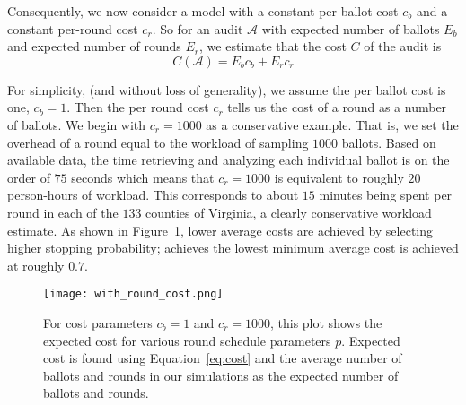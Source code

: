 Consequently, we now consider a model with a constant per-ballot cost $c_b$ and a constant per-round cost $c_r$.
So for an audit $\mathcal{A}$ with expected number of ballots $E_{b}$ and expected number of rounds $E_{r}$, we estimate that the cost $C$ of the audit is
\begin{equation}
C(\mathcal{A}) = E_b c_b + E_r c_r
\label{eq:round_cost}
\end{equation}

For simplicity, (and without loss of generality), we assume the per ballot cost is one, $c_b=1$. Then the per round cost $c_r$ tells us the cost of a round as a number of ballots. We begin with $c_r=1000$ as a conservative example. 
That is, we set the overhead of a round equal to the workload of sampling $1000$ ballots. Based on available data\cite{RI-report}, the time retrieving and analyzing each individual ballot is on the order of $75$ seconds which means that $c_r=1000$ is equivalent to roughly $20$ person-hours of workload. This corresponds to about $15$ minutes being spent per round in each of the $133$ counties of Virginia, a clearly conservative workload estimate. 
As shown in Figure~\ref{fig:with_round_cost}, lower average costs are achieved by selecting higher stopping probability; \Providence achieves the lowest minimum average cost is achieved at roughly $0.7$.

\begin{figure}
\texttt{[image: with\_round\_cost.png]}
\caption{For cost parameters $c_b=1$ and $c_r=1000$, this plot shows the expected cost for various round schedule parameters $p$. Expected cost is found using Equation~\ref{eq:cost} and the average number of ballots and rounds in our simulations as the expected number of ballots and rounds.}
\label{fig:with_round_cost}
\end{figure}

